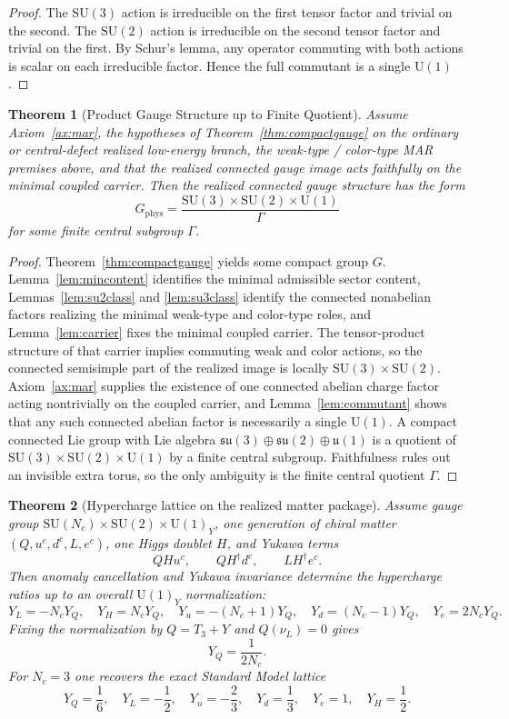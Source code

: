 \documentclass[11pt]{article}
\newtheorem{theorem}{Theorem}[section]
\newcommand{\SU}{\mathrm{SU}}
\newcommand{\U}{\mathrm{U}}
\begin{document}
\begin{proof}
The $\SU(3)$ action is irreducible on the first tensor factor and trivial on the second. The $\SU(2)$ action is irreducible on the second tensor factor and trivial on the first. By Schur's lemma, any operator commuting with both actions is scalar on each irreducible factor. Hence the full commutant is a single $\U(1)$.
\end{proof}

\begin{theorem}[Product Gauge Structure up to Finite Quotient]\label{thm:sm}
Assume Axiom~\ref{ax:mar}, the hypotheses of Theorem~\ref{thm:compactgauge} on the ordinary or central-defect realized low-energy branch, the weak-type / color-type MAR premises above, and that the realized connected gauge image acts faithfully on the minimal coupled carrier. Then the realized connected gauge structure has the form
\[
G_{\mathrm{phys}}=
\frac{\SU(3)\times\SU(2)\times\U(1)}{\Gamma}
\]
for some finite central subgroup $\Gamma$.
\end{theorem}

\begin{proof}
Theorem~\ref{thm:compactgauge} yields some compact group $G$. Lemma~\ref{lem:mincontent} identifies the minimal admissible sector content, Lemmas~\ref{lem:su2class} and \ref{lem:su3class} identify the connected nonabelian factors realizing the minimal weak-type and color-type roles, and Lemma~\ref{lem:carrier} fixes the minimal coupled carrier. The tensor-product structure of that carrier implies commuting weak and color actions, so the connected semisimple part of the realized image is locally $\SU(3)\times\SU(2)$. Axiom~\ref{ax:mar} supplies the existence of one connected abelian charge factor acting nontrivially on the coupled carrier, and Lemma~\ref{lem:commutant} shows that any such connected abelian factor is necessarily a single $\U(1)$. A compact connected Lie group with Lie algebra $\mathfrak{su}(3)\oplus\mathfrak{su}(2)\oplus\mathfrak{u}(1)$ is a quotient of $\SU(3)\times\SU(2)\times\U(1)$ by a finite central subgroup. Faithfulness rules out an invisible extra torus, so the only ambiguity is the finite central quotient $\Gamma$.
\end{proof}

\begin{theorem}[Hypercharge lattice on the realized matter package]\label{thm:hypercharge}
Assume gauge group $\SU(N_c)\times\SU(2)\times\U(1)_Y$, one generation of chiral matter $(Q,u^c,d^c,L,e^c)$, one Higgs doublet $H$, and Yukawa terms
\[
QHu^c,\qquad QH^\dagger d^c,\qquad LH^\dagger e^c.
\]
Then anomaly cancellation and Yukawa invariance determine the hypercharge ratios up to an overall \(\U(1)_Y\) normalization:
\[
Y_L=-N_cY_Q,\quad
Y_H=N_cY_Q,\quad
Y_u=-(N_c+1)Y_Q,\quad
Y_d=(N_c-1)Y_Q,\quad
Y_e=2N_cY_Q.
\]
Fixing the normalization by $Q=T_3+Y$ and $Q(\nu_L)=0$ gives
\[
Y_Q=\frac{1}{2N_c}.
\]
For $N_c=3$ one recovers the exact Standard Model lattice
\[
Y_Q=\frac16,\quad
Y_L=-\frac12,\quad
Y_u=-\frac23,\quad
Y_d=\frac13,\quad
Y_e=1,\quad
Y_H=\frac12.
\]
\end{theorem}
\end{document}

